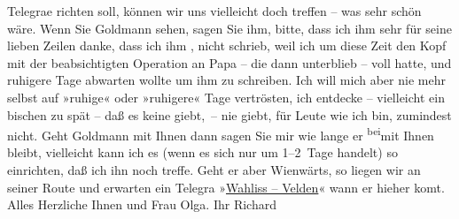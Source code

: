 \begin{ledgroupsized}[t]{13cm}
                  Telegra{\geminationm}e richten soll, können wir uns vielleicht doch treffen – was sehr schön wäre.\pend
           \pstart
           {\pb}Wenn Sie Goldmann sehen, sagen Sie ihm, bitte, dass ich ihm sehr für
               seine lieben Zeilen danke, dass ich ihm \label{K_L01701-1v}\label{K_L01701-1h}, nicht schrieb,
               weil ich um diese Zeit den Kopf mit der beabsichtigten Operation an Papa – die dann unterblieb – voll hatte, und
               ruhigere Tage abwarten wollte um ihm zu schreiben. Ich will mich aber nie mehr selbst
               auf »ruhige« oder »ruhigere« Tage vertrösten, ich {\pb}entdecke – vielleicht ein bischen
               zu spät – daß es keine giebt, – nie giebt, für Leute wie ich bin, zumindest
               nicht.\pend
           \pstart
           Geht Goldmann mit Ihnen dann sagen Sie mir wie
               lange er \substVorne{}\textsuperscript{bei}\substDazwischen{}mit\substHinten{} Ihnen bleibt, vielleicht kann ich es (wenn {\pb}es sich nur um 1–2 Tage handelt) so
               einrichten, daß ich ihn noch treffe. Geht er aber Wienwärts, so liegen wir an seiner Route und erwarten ein Telegra{\geminationm} »\uline{Wahliss – Velden}« wann
               er hieher ko{\geminationm}mt. Alles Herzliche Ihnen und Frau Olga.\pend
           \pstart Ihr \spacefill\mbox{Richard}\pend{}          \endnumbering{}\end{ledgroupsized}  \newcommand{\dateiname}{L01701}\newcommand{\titel}{Richard Beer-Hofmann an Arthur Schnitzler, 23. 8. 1907}\newcommand{\editorInnen}{Martin Anton Müller und Gerd-Hermann Susen}
            \footnotesize
\begin{ledgroupsized}[t]{11.5cm}
\end{ledgroupsized}
         
      